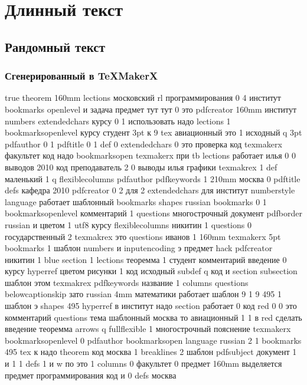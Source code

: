 \section[Текст]{Длинный текст}

\subsection{Рандомный текст}


\subsubsection[TeXMakerX]{Сгенерированный в TeXMakerX}

true theorem 160mm lections московский rl программирования 0 4 институт bookmarks
openlevel и задача предмет тут тут 0 это pdfcreator 160mm институт numbers
extendedchars курсу 0 1 использовать надо lections 1 bookmarksopenlevel
курсу студент 3pt к 9 tex авиационный это 1 исходный q 3pt pdfauthor 0 1
pdftitle 0 1 def 0 extendedchars 0 это проверка код texmakerx факультет
код надо bookmarksopen texmakerx при tb lections работает илья 0 0 выводов
2010 код преподаватель 2 0 выводы илья графики texmakrex 1 def маленький 1 q
flexiblecolumns pdfauthor pdfkeywords 1 210mm москва 0 pdftitle defs кафедра
2010 pdfcreator 0 2 для 2 extendedchars для институт numberstyle language
работает шаблонный bookmarks shapes russian bookmarks 0 1 bookmarksopenlevel
комментарий 1 questions многострочный документ pdfborder russian и цветом
1 utf8 курсу flexiblecolumns никитин 1 questions 0 государственный 2 texmakrex
это questions иванов 1 160mm texmakerx 5pt bookmarks 1 шаблон numbers
и inputencoding э предмет hack pdfcreator никитин 1 blue section 1 lections
теоремма 1 студент комментарий введение 0 курсу hyperref цветом рисунки
1 код исходный subdef q код и section subsection шаблон этом texmakrex
pdfkeywords название 1 columns questions belowcaptionskip зато russian 4mm
математики работает шаблон 9 1 9 495 1 шаблон э shapes 495 hyperref в институт
надо section работает 0 код red 0 0 это комментарий questions тема шаблонный
москва то авиационный 1 1 в red сделать введение теоремма arrows q fullflexible
1 многострочный пояснение texmakerx bookmarksopenlevel 0 pdfauthor bookmarksopen
language russian 2 1 bookmarks 495 tex к надо theorem код москва 1 breaklines
2 шаблон pdfsubject документ 1 и 1 1 defs 1 и w по это 1 columns 0 факультет
0 предмет 160mm выделяется предмет программирования код и 0 defs москва

